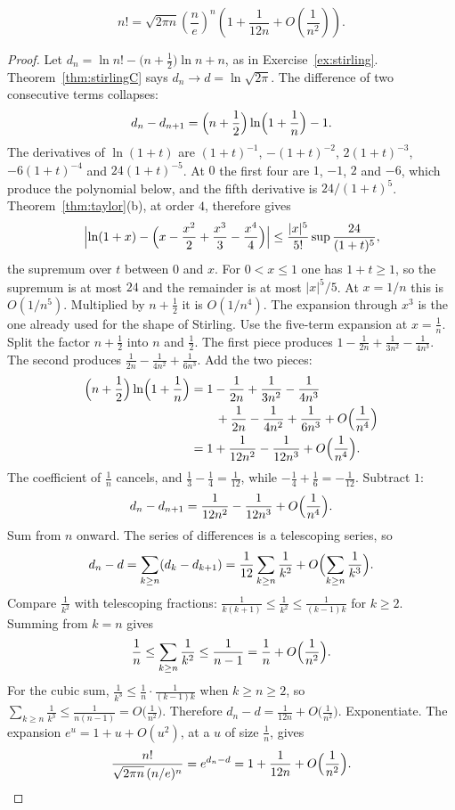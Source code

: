 \begin{proposition}\label{prop:stirlingnext}
\[n!=\sqrt{2\pi n}\left(\frac ne\right)^n\left(1+\frac1{12n}+O\!\left(\frac1{n^2}\right)\right).\]
\end{proposition}
\begin{proof}
Let $d_n=\ln n!-\bigl(n+\frac12\bigr)\ln n+n$, as in Exercise~\ref{ex:stirling}. Theorem~\ref{thm:stirlingC} says $d_n\to d=\ln\sqrt{2\pi}$. The difference of two consecutive terms collapses:
\[
d_n-d_{n+1}=\Bigl(n+\frac12\Bigr)\ln\Bigl(1+\frac1n\Bigr)-1.
\]
The derivatives of $\ln(1+t)$ are $(1+t)^{-1}$, $-(1+t)^{-2}$, $2(1+t)^{-3}$, $-6(1+t)^{-4}$ and $24(1+t)^{-5}$. At $0$ the first four are $1$, $-1$, $2$ and $-6$, which produce the polynomial below, and the fifth derivative is $24/(1+t)^5$. Theorem~\ref{thm:taylor}(b), at order $4$, therefore gives
\[
\Bigl|\ln(1+x)-\Bigl(x-\frac{x^2}2+\frac{x^3}3-\frac{x^4}4\Bigr)\Bigr|
\le\frac{|x|^5}{5!}\sup\frac{24}{(1+t)^5},
\]
the supremum over $t$ between $0$ and $x$. For $0<x\le1$ one has $1+t\ge1$, so the supremum is at most $24$ and the remainder is at most $|x|^5/5$. At $x=1/n$ this is $O(1/n^5)$. Multiplied by $n+\frac12$ it is $O(1/n^4)$. The expansion through $x^3$ is the one already used for the shape of Stirling. Use the five-term expansion at $x=\frac1n$. Split the factor $n+\frac12$ into $n$ and $\frac12$. The first piece produces $1-\frac1{2n}+\frac1{3n^2}-\frac1{4n^3}$. The second produces $\frac1{2n}-\frac1{4n^2}+\frac1{6n^3}$. Add the two pieces:
\begin{align*}
\Bigl(n+\frac12\Bigr)\ln\Bigl(1+\frac1n\Bigr)
&=1-\frac1{2n}+\frac1{3n^2}-\frac1{4n^3}\\
&\qquad+\frac1{2n}-\frac1{4n^2}+\frac1{6n^3}+O\Bigl(\frac1{n^4}\Bigr)\\
&=1+\frac1{12n^2}-\frac1{12n^3}+O\Bigl(\frac1{n^4}\Bigr).
\end{align*}
The coefficient of $\frac1n$ cancels, and $\frac13-\frac14=\frac1{12}$, while $-\frac14+\frac16=-\frac1{12}$. Subtract $1$:
\[
d_n-d_{n+1}=\frac1{12n^2}-\frac1{12n^3}+O\Bigl(\frac1{n^4}\Bigr).
\]
Sum from $n$ onward. The series of differences is a telescoping series, so
\[
d_n-d=\sum_{k\ge n}(d_k-d_{k+1})=\frac1{12}\sum_{k\ge n}\frac1{k^2}+O\Bigl(\sum_{k\ge n}\frac1{k^3}\Bigr).
\]
Compare $\frac1{k^2}$ with telescoping fractions: $\frac1{k(k+1)}\le\frac1{k^2}\le\frac1{(k-1)k}$ for $k\ge2$. Summing from $k=n$ gives
\[
\frac1n\le\sum_{k\ge n}\frac1{k^2}\le\frac1{n-1}=\frac1n+O\Bigl(\frac1{n^2}\Bigr).
\]
For the cubic sum, $\frac1{k^3}\le\frac1n\cdot\frac1{(k-1)k}$ when $k\ge n\ge2$, so $\sum_{k\ge n}\frac1{k^3}\le\frac1{n(n-1)}=O\bigl(\frac1{n^2}\bigr)$. Therefore $d_n-d=\frac1{12n}+O\bigl(\frac1{n^2}\bigr)$. Exponentiate. The expansion $e^u=1+u+O(u^2)$, at a $u$ of size $\frac1n$, gives
\[
\frac{n!}{\sqrt{2\pi n}\,(n/e)^n}=e^{d_n-d}=1+\frac1{12n}+O\Bigl(\frac1{n^2}\Bigr).
\]
\end{proof}

